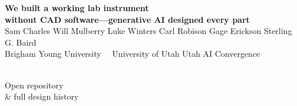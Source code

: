 \documentclass[a0,landscape]{a0poster}
\begin{document}
\begin{tcolorbox}[enhanced, colback=navy, colframe=navy, arc=8pt,
  left=30pt, right=30pt, top=16pt, bottom=16pt, boxrule=0pt]
\color{white}
\begin{minipage}[c]{0.80\linewidth}
  \raggedright
  {\veryHuge\bfseries We built a working lab instrument\\[10pt]
   without CAD software---generative AI designed every part}\\[18pt]
  {\Large Sam Charles \quad Will Mulberry \quad Luke Winters \quad
   Carl Robison \quad Gage Erickson \quad Sterling G. Baird}\\[6pt]
  {\large Brigham Young University \ \textbar\ University of Utah
   \qquad\textbullet\qquad Utah AI Convergence}
\end{minipage}\hfill
\begin{minipage}[c]{0.16\linewidth}\centering
  \colorbox{white}{}\\[8pt]
  {\large Open repository\\ \& full design history}
\end{minipage}
\end{tcolorbox}

\vspace{10pt}
\end{document}
